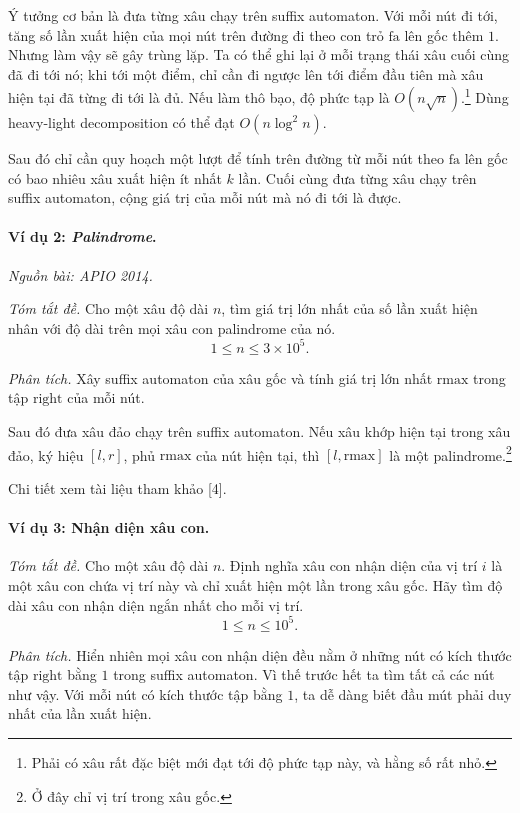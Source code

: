 \documentclass[11pt]{article}
\begin{document}
Ý tưởng cơ bản là đưa từng xâu chạy trên suffix automaton. Với mỗi nút đi tới,
tăng số lần xuất hiện của mọi nút trên đường đi theo con trỏ \(\mathrm{fa}\)
lên gốc thêm \(1\). Nhưng làm vậy sẽ gây trùng lặp. Ta có thể ghi lại ở mỗi
trạng thái xâu cuối cùng đã đi tới nó; khi tới một điểm, chỉ cần đi ngược lên
tới điểm đầu tiên mà xâu hiện tại đã từng đi tới là đủ. Nếu làm thô bạo, độ
phức tạp là \(O(n\sqrt n)\).\footnote{Phải có xâu rất đặc biệt mới đạt tới độ
phức tạp này, và hằng số rất nhỏ.} Dùng heavy-light decomposition có thể đạt
\(O(n\log^2 n)\).

Sau đó chỉ cần quy hoạch một lượt để tính trên đường từ mỗi nút theo
\(\mathrm{fa}\) lên gốc có bao nhiêu xâu xuất hiện ít nhất \(k\) lần. Cuối cùng
đưa từng xâu chạy trên suffix automaton, cộng giá trị của mỗi nút mà nó đi tới
là được.

\paragraph{Ví dụ 2: \emph{Palindrome}.}
\emph{Nguồn bài: APIO 2014.}

\emph{Tóm tắt đề.}
Cho một xâu độ dài \(n\), tìm giá trị lớn nhất của số lần xuất hiện nhân với độ
dài trên mọi xâu con palindrome của nó.
\[
  1\le n\le 3\times 10^5.
\]

\emph{Phân tích.}
Xây suffix automaton của xâu gốc và tính giá trị lớn nhất
\(\mathrm{rmax}\) trong tập \(\mathrm{right}\) của mỗi nút.

Sau đó đưa xâu đảo chạy trên suffix automaton. Nếu xâu khớp hiện tại trong xâu
đảo, ký hiệu \([l,r]\), phủ \(\mathrm{rmax}\) của nút hiện tại, thì
\([l,\mathrm{rmax}]\) là một palindrome.\footnote{Ở đây chỉ vị trí trong xâu
gốc.}

Chi tiết xem tài liệu tham khảo [4].

\paragraph{Ví dụ 3: Nhận diện xâu con.}

\emph{Tóm tắt đề.}
Cho một xâu độ dài \(n\). Định nghĩa xâu con nhận diện của vị trí \(i\) là một
xâu con chứa vị trí này và chỉ xuất hiện một lần trong xâu gốc. Hãy tìm độ dài
xâu con nhận diện ngắn nhất cho mỗi vị trí.
\[
  1\le n\le 10^5.
\]

\emph{Phân tích.}
Hiển nhiên mọi xâu con nhận diện đều nằm ở những nút có kích thước tập
\(\mathrm{right}\) bằng \(1\) trong suffix automaton. Vì thế trước hết ta tìm
tất cả các nút như vậy. Với mỗi nút có kích thước tập bằng \(1\), ta dễ dàng
biết đầu mút phải duy nhất của lần xuất hiện.
\end{document}
